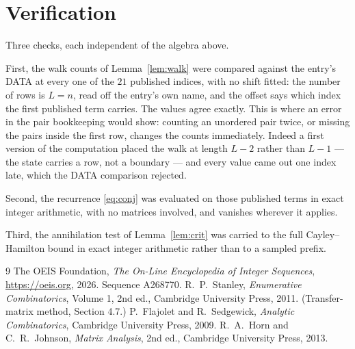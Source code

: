 \documentclass[11pt,a4paper]{article}
\theoremstyle{plain}
\theoremstyle{definition}
\begin{document}
\section{Verification}

Three checks, each independent of the algebra above.

First, the walk counts of Lemma~\ref{lem:walk} were compared against the entry's DATA at
every one of the $21$ published indices, with no shift fitted: the number of rows is
$L=n$, read off the entry's own name, and the offset says which index the first
published term carries. The values agree exactly. This is where an error in the pair
bookkeeping would show: counting an unordered pair twice, or missing the pairs inside the
first row, changes the counts immediately. Indeed a first version of the computation
placed the walk at length $L-2$ rather than $L-1$ --- the state carries a row, not a
boundary --- and every value came out one index late, which the DATA comparison rejected.

Second, the recurrence \eqref{eq:conj} was evaluated on those published terms in exact
integer arithmetic, with no matrices involved, and vanishes wherever it applies.

Third, the annihilation test of Lemma~\ref{lem:crit} was carried to the full
Cayley--Hamilton bound in exact integer arithmetic rather than to a sampled prefix.

\begin{thebibliography}{9}
 The OEIS Foundation, \emph{The On-Line Encyclopedia of Integer
Sequences}, \url{https://oeis.org}, 2026. Sequence A268770.
 R.~P.~Stanley, \emph{Enumerative Combinatorics}, Volume 1, 2nd ed.,
Cambridge University Press, 2011. (Transfer-matrix method, Section 4.7.)
 P.~Flajolet and R.~Sedgewick, \emph{Analytic Combinatorics}, Cambridge
University Press, 2009.
 R.~A.~Horn and C.~R.~Johnson, \emph{Matrix Analysis}, 2nd ed., Cambridge
University Press, 2013.
\end{thebibliography}
\end{document}
